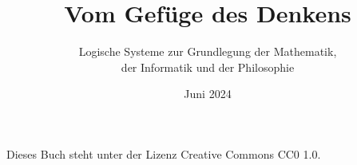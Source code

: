 \documentclass[paper=186mm:234mm,pagesize=auto,fleqn,11pt,dvipdfmx]{scrbook}
\title{Vom Gefüge des Denkens}
\subtitle{Logische Systeme zur Grundlegung der Mathematik,\\
der Informatik und der Philosophie}
\date{Juni 2024}
\theoremstyle{rmbox}
\numberwithin{Definition}{chapter}
\numberwithin{Satz}{chapter}
\begin{document}
\renewcommand{\thepage}{C\arabic{page}}


\newpage
\thispagestyle{empty}
\mbox{}

\newpage
\addtocounter{page}{-2}
\renewcommand{\thepage}{\arabic{page}}
\thispagestyle{empty}

\maketitle


\noindent
Dieses Buch steht unter der Lizenz Creative Commons CC0 1.0.

\tableofcontents













\printindex
\end{document}
